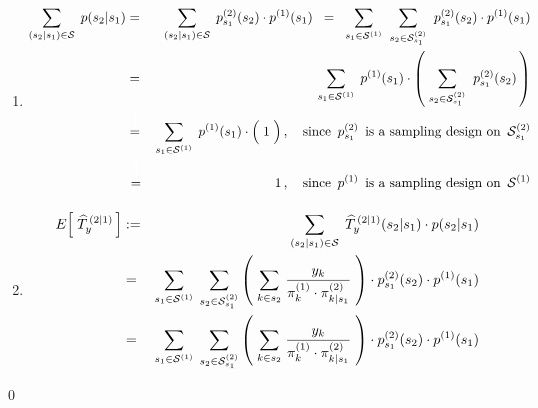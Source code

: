\proof
\begin{enumerate}
\item
	\begin{eqnarray*}
	\underset{(s_{2} \vert s_{1}) \in \mathcal{S}}{\sum}\;\, p(s_{2} \vert s_{1})
	& = &
		\underset{(s_{2} \vert s_{1}) \in \mathcal{S}}{\sum}\;\, p^{(2)}_{s_{1}}(s_{2}) \cdot p^{(1)}(s_{1})
	\;\; = \;\;
		\underset{s_{1} \in \mathcal{S}^{(1)}}{\sum}\;\;
		\underset{s_{2} \in \mathcal{S}^{(2)}_{s_{1}}}{\sum}\;\;
		p^{(2)}_{s_{1}}(s_{2}) \cdot p^{(1)}(s_{1})
	\\
	& = &
		\underset{s_{1} \in \mathcal{S}^{(1)}}{\sum}\;\,
		p^{(1)}(s_{1}) \cdot
		\left(\;
			\underset{s_{2} \in \mathcal{S}^{(2)}_{s_{1}}}{\sum}\;\; p^{(2)}_{s_{1}}(s_{2})
		\,\right)
	\\
	& \overset{{\color{white}\textnormal{\LARGE$1$}}}{=} &
		\underset{s_{1} \in \mathcal{S}^{(1)}}{\sum}\;\,
		p^{(1)}(s_{1}) \cdot
		\left(\; \overset{{\color{white}.}}{1} \;\right),
		\quad\textnormal{since \,$p^{(2)}_{s_{1}}$\, is a sampling design on \,$\mathcal{S}^{(2)}_{s_{1}}$}
	\\
	& \overset{{\color{white}\textnormal{\huge$1$}}}{=} &
		1\,,
		\quad\textnormal{since \,$p^{(1)}$\, is a sampling design on \,$\mathcal{S}^{(1)}$}
	\end{eqnarray*}
\item
	\begin{eqnarray*}
	E\!\left[\;\widehat{T}^{\,(2 \vert 1)}_{y}\,\right]
	& := &
		\underset{(s_{2} \vert s_{1})\in\mathcal{S}}{\sum}\;\,
		\widehat{T}^{\,(2 \vert 1)}_{y}(s_{2} \vert s_{1}) \cdot p(s_{2} \vert s_{1})
	\\
	& = &
		\underset{s_{1} \in \mathcal{S}^{(1)}}{\sum}\;\,
		\underset{s_{2} \in \mathcal{S}^{(2)}_{s_{1}}}{\sum}
		\left(\;
			\underset{k \in s_{2}}{\sum}\;\dfrac{y_{k}}{ \pi^{(1)}_{k} \cdot \pi^{(2)}_{k \vert s_{1}} }
		\;\right)
		\cdot
		p^{(2)}_{s_{1}}(s_{2}) \cdot p^{(1)}(s_{1})
	\\
	& = &
		\underset{s_{1} \in \mathcal{S}^{(1)}}{\sum}\;\,
		\underset{s_{2} \in \mathcal{S}^{(2)}_{s_{1}}}{\sum}
		\left(\;
			\underset{k \in s_{2}}{\sum}\;\dfrac{y_{k}}{ \pi^{(1)}_{k} \cdot \pi^{(2)}_{k \vert s_{1}} }
		\;\right)
		\cdot
		p^{(2)}_{s_{1}}(s_{2}) \cdot p^{(1)}(s_{1})
	\end{eqnarray*}
\end{enumerate}
\qed


\renewcommand{\theenumi}{\roman{enumi}}
\renewcommand{\labelenumi}{\textnormal{(\theenumi)}$\;\;$}
